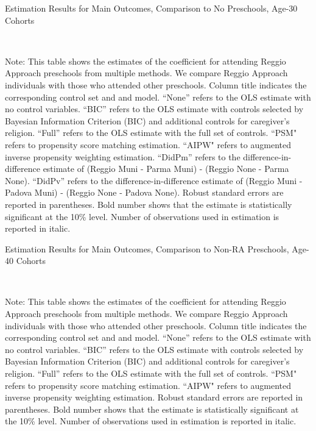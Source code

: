 \begin{table}[H] \caption{Estimation Results for Main Outcomes, Comparison to No Preschools, Age-30 Cohorts} \label{ols-M-adult30-reg-nopres}
\scalebox{0.65}{}
\vspace{1ex} \\
\footnotesize\raggedright{Note: This table shows the estimates of the coefficient for attending Reggio Approach preschools from multiple methods. We compare Reggio Approach individuals with those who attended other preschools. Column title indicates the corresponding control set and and model. ``None'' refers to the OLS estimate with no control variables. ``BIC'' refers to the OLS estimate with controls selected by Bayesian Information Criterion (BIC) and additional controls for caregiver's religion. ``Full'' refers to the OLS estimate with the full set of controls. ``PSM" refers to propensity score matching estimation. ``AIPW" refers to augmented inverse propensity weighting estimation. ``DidPm'' refers to the difference-in-difference estimate of (Reggio Muni - Parma Muni) - (Reggio None - Parma None). ``DidPv'' refers to the difference-in-difference estimate of (Reggio Muni - Padova Muni) - (Reggio None - Padova None). Robust standard errors are reported in parentheses. Bold number shows that the estimate is statistically significant at the 10\% level. Number of observations used in estimation is reported in italic.}
\end{table}





\begin{table}[H] \caption{Estimation Results for Main Outcomes, Comparison to Non-RA Preschools, Age-40 Cohorts} \label{ols-M-adult40-reg-pres}
\scalebox{0.65}{}
\vspace{1ex} \\
\footnotesize\raggedright{Note: This table shows the estimates of the coefficient for attending Reggio Approach preschools from multiple methods. We compare Reggio Approach individuals with those who attended other preschools. Column title indicates the corresponding control set and and model. ``None'' refers to the OLS estimate with no control variables. ``BIC'' refers to the OLS estimate with controls selected by Bayesian Information Criterion (BIC) and additional controls for caregiver's religion. ``Full'' refers to the OLS estimate with the full set of controls. ``PSM" refers to propensity score matching estimation. ``AIPW" refers to augmented inverse propensity weighting estimation. Robust standard errors are reported in parentheses. Bold number shows that the estimate is statistically significant at the 10\% level. Number of observations used in estimation is reported in italic.}
\end{table}

